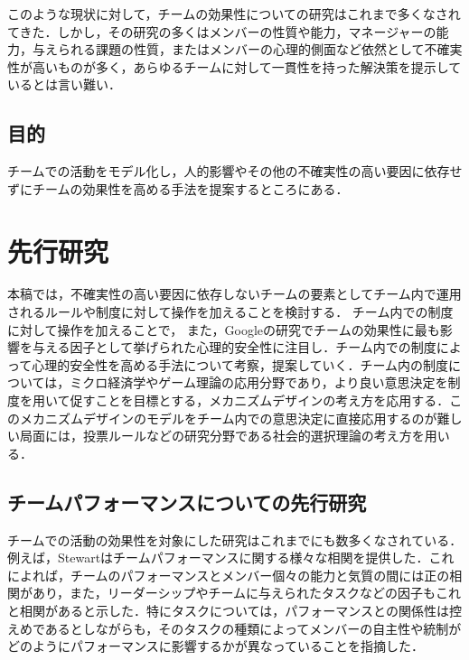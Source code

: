 \documentclass[a4paper, 11pt]{jsarticle}
\begin{document}
このような現状に対して，チームの効果性についての研究はこれまで多くなされてきた．しかし，その研究の多くはメンバーの性質や能力，マネージャーの能力，与えられる課題の性質，またはメンバーの心理的側面など依然として不確実性が高いものが多く，あらゆるチームに対して一貫性を持った解決策を提示しているとは言い難い．
\subsection{目的}
チームでの活動をモデル化し，人的影響やその他の不確実性の高い要因に依存せずにチームの効果性を高める手法を提案するところにある．

\section{先行研究}
本稿では，不確実性の高い要因に依存しないチームの要素としてチーム内で運用されるルールや制度に対して操作を加えることを検討する．
チーム内での制度に対して操作を加えることで，
また，Googleの研究でチームの効果性に最も影響を与える因子として挙げられた心理的安全性に注目し．チーム内での制度によって心理的安全性を高める手法について考察，提案していく．チーム内の制度については，ミクロ経済学やゲーム理論の応用分野であり，より良い意思決定を制度を用いて促すことを目標とする，メカニズムデザインの考え方を応用する．このメカニズムデザインのモデルをチーム内での意思決定に直接応用するのが難しい局面には，投票ルールなどの研究分野である社会的選択理論の考え方を用いる．

\subsection{チームパフォーマンスについての先行研究}
チームでの活動の効果性を対象にした研究はこれまでにも数多くなされている．例えば，Stewart\cite{Stewart}はチームパフォーマンスに関する様々な相関を提供した．これによれば，チームのパフォーマンスとメンバー個々の能力と気質の間には正の相関があり，また，リーダーシップやチームに与えられたタスクなどの因子もこれと相関があると示した．特にタスクについては，パフォーマンスとの関係性は控えめであるとしながらも，そのタスクの種類によってメンバーの自主性や統制がどのようにパフォーマンスに影響するかが異なっていることを指摘した．
\end{document}
